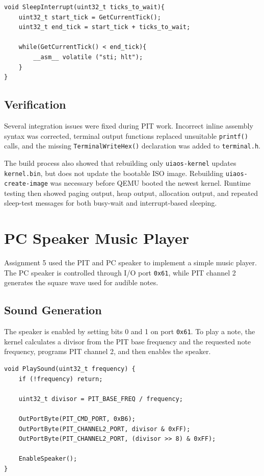 \begin{listing}[H]
\begin{verbatim}
void SleepInterrupt(uint32_t ticks_to_wait){
    uint32_t start_tick = GetCurrentTick();
    uint32_t end_tick = start_tick + ticks_to_wait;

    while(GetCurrentTick() < end_tick){
        __asm__ volatile ("sti; hlt");
    }
}
\end{verbatim}
\caption{Interrupt-based sleeping using the PIT tick counter and \texttt{hlt}.}
\end{listing}

\subsection{Verification}
Several integration issues were fixed during PIT work. Incorrect inline assembly syntax was corrected, terminal output functions replaced unsuitable \texttt{printf()} calls, and the missing \texttt{TerminalWriteHex()} declaration was added to \texttt{terminal.h}.

The build process also showed that rebuilding only \texttt{uiaos-kernel} updates \texttt{kernel.bin}, but does not update the bootable ISO image. Rebuilding \texttt{uiaos-create-image} was necessary before QEMU booted the newest kernel. Runtime testing then showed paging output, heap output, allocation output, and repeated sleep-test messages for both busy-wait and interrupt-based sleeping.

\section{PC Speaker Music Player}

Assignment 5 used the PIT and PC speaker to implement a simple music player. The PC speaker is controlled through I/O port \texttt{0x61}, while PIT channel 2 generates the square wave used for audible notes.

\subsection{Sound Generation}
The speaker is enabled by setting bits 0 and 1 on port \texttt{0x61}. To play a note, the kernel calculates a divisor from the PIT base frequency and the requested note frequency, programs PIT channel 2, and then enables the speaker.

\begin{listing}[H]
\begin{verbatim}
void PlaySound(uint32_t frequency) {
    if (!frequency) return;

    uint32_t divisor = PIT_BASE_FREQ / frequency;

    OutPortByte(PIT_CMD_PORT, 0xB6);
    OutPortByte(PIT_CHANNEL2_PORT, divisor & 0xFF);
    OutPortByte(PIT_CHANNEL2_PORT, (divisor >> 8) & 0xFF);

    EnableSpeaker();
}
\end{verbatim}
\caption{Programming PIT channel 2 to generate a PC speaker tone.}
\end{listing}
\clearpage

